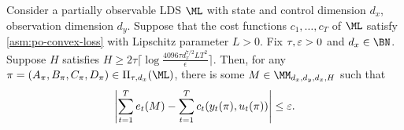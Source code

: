 \begin{lemma} 
\label{lem:po-approx-ldc}
Consider a partially observable LDS $\ML$ with state and control dimension $d_x$, observation dimension $d_y$. Suppose that the cost functions $c_1,\dots,c_T$ of $\ML$ satisfy \cref{asm:po-convex-loss} with Lipschitz parameter $L>0$. Fix $\tau, \varepsilon>0$ and $d_x\in\BN$. Suppose $H$ satisfies $H\ge 2\tau\lceil \log\frac{4096\tau d_x^{7/2} L T^2}{\epsilon}\rceil$. Then, for any $\pi=(A_{\pi},B_{\pi},C_{\pi},D_{\pi})\in\Pi_{\tau, d_x}(\ML)$, there is some $M\in\MM_{d_x,d_y,d_x,H}$ such that 
\begin{align*}
\left|\sum_{t=1}^T e_t(M)-\sum_{t=1}^T c_t(y_t(\pi), u_t(\pi))\right|\le \varepsilon.  
\end{align*}
\end{lemma}
